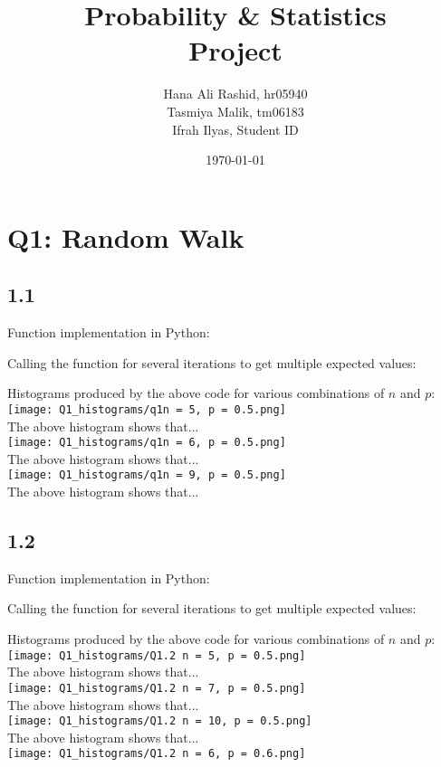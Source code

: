 \documentclass[answers]{exam}
\title{Probability \& Statistics\\ Project}
\author{Hana Ali Rashid, hr05940\\ Tasmiya Malik, tm06183\\ Ifrah Ilyas, Student ID}
\date{\today{}}
\begin{document}
\maketitle



\section*{Q1: Random Walk}
\subsection*{1.1}
Function implementation in Python:

Calling the function for several iterations to get multiple expected values:

\pagebreak
Histograms produced by the above code for various combinations of $n$ and $p$:\\
\texttt{[image: Q1\_histograms/q1n = 5, p = 0.5.png]}\\
The above histogram shows that...\\
\texttt{[image: Q1\_histograms/q1n = 6, p = 0.5.png]}\\
The above histogram shows that...\\
\texttt{[image: Q1\_histograms/q1n = 9, p = 0.5.png]}\\
The above histogram shows that...\\
\pagebreak
\subsection*{1.2}
Function implementation in Python:

Calling the function for several iterations to get multiple expected values:

\pagebreak
Histograms produced by the above code for various combinations of $n$ and $p$:\\
\texttt{[image: Q1\_histograms/Q1.2 n = 5, p = 0.5.png]}\\
The above histogram shows that...\\
\texttt{[image: Q1\_histograms/Q1.2 n = 7, p = 0.5.png]}\\
The above histogram shows that...\\
\texttt{[image: Q1\_histograms/Q1.2 n = 10, p = 0.5.png]}\\
The above histogram shows that...\\
\texttt{[image: Q1\_histograms/Q1.2 n = 6, p = 0.6.png]}
\end{document}
